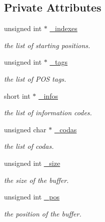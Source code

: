 \subsection*{Private Attributes}
\begin{CompactItemize}
\item 
unsigned int $\ast$ \hyperlink{classkmaOrange_1_1JEBuffer_8206c9c71650e6daad097f4ddd168acb}{\_\-indexes}
\begin{CompactList}\small\item\em the list of starting positions. \item\end{CompactList}\item 
unsigned int $\ast$ \hyperlink{classkmaOrange_1_1JEBuffer_0b50e5baadc2fa26a8fec01cde35ef9f}{\_\-tags}
\begin{CompactList}\small\item\em the list of POS tags. \item\end{CompactList}\item 
short int $\ast$ \hyperlink{classkmaOrange_1_1JEBuffer_4eeb75367509a98bf49f65433684fb15}{\_\-infos}
\begin{CompactList}\small\item\em the list of information codes. \item\end{CompactList}\item 
unsigned char $\ast$ \hyperlink{classkmaOrange_1_1JEBuffer_29fea2590f8a6de7f9e68c1ef8209be8}{\_\-codas}
\begin{CompactList}\small\item\em the list of codas. \item\end{CompactList}\item 
unsigned int \hyperlink{classkmaOrange_1_1JEBuffer_a6cc6d994de00fa730148f6b63abdab8}{\_\-size}
\begin{CompactList}\small\item\em the size of the buffer. \item\end{CompactList}\item 
unsigned int \hyperlink{classkmaOrange_1_1JEBuffer_8ddb33c9299dd4c93fb6dd976b2b95dc}{\_\-pos}
\begin{CompactList}\small\item\em the position of the buffer. \item\end{CompactList}\end{CompactItemize}


